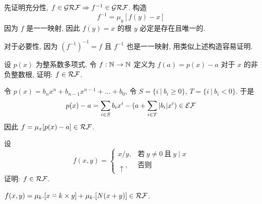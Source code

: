 \begin{solution}
先证明充分性, $f \in \mathcal{GRF} \Rightarrow f^{-1} \in \mathcal{GRF}$. 构造
\[
f^{-1} = \mu_{y} [f(y) - x]
\]
因为 $f$ 是一一映射, 因此 $f(y) = x$ 的根 $y$ 必定是存在且唯一的.

对于必要性, 因为 $(f^{-1})^{-1} = f$ 且 $f^{-1}$ 也是一一映射, 用类似上述构造容易证明.
\end{solution}

\begin{problem}
设 $p(x)$ 为整系数多项式, 令 $f : \mathbb{N}^{} \to \mathbb{N}^{}$ 定义为 $f(a) = p(x) - a$ 对于 $x$ 的非负整数根, 证明: $f \in \mathcal{RF}$.
\end{problem}

\begin{solution}
令 $p(x) = b_n x^n + b_{n-1}x^{n-1} + \dots + b_0$, 令 $S = \{ i ~ | ~ b_i \ge 0 \}$, $T = \{ i ~ | ~ b_i < 0 \}$. 于是
\[
p(x)-a = \sum_{i \in S} b_i x^i - (a + \sum_{i \in T} |b_i| x^i) \in \mathcal{EF}
\]
因此 $f = \mu_{x} [p(x) - a] \in \mathcal{RF}$.
\end{solution}

\begin{problem}
设
\[
f(x,y) = \begin{cases}
x / y, & \text{若} ~ y \neq 0 ~ \text{且} ~ y \mid x \\
\uparrow, & \text{否则}
\end{cases}
\]
证明: $f \in \mathcal{RF}$.
\end{problem}

\begin{solution}
$f(x, y) = \mu_{k}. [x \dotdotminus k \times y] + \mu_{k}. [N(x + y)] \in \RF$.
\end{solution}




